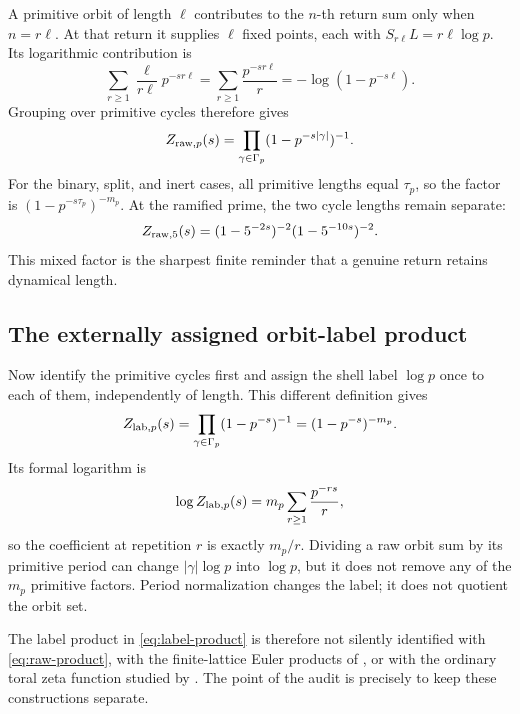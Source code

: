 \documentclass[11pt]{article}
\theoremstyle{definition}
\theoremstyle{remark}
\begin{document}
A primitive orbit of length \(\ell\) contributes to the \(n\)-th return sum
only when \(n=r\ell\).  At that return it supplies \(\ell\) fixed points,
each with \(S_{r\ell}L=r\ell\log p\).  Its logarithmic contribution is
\begin{equation}
  \sum_{r\ge1}\frac{\ell}{r\ell}p^{-sr\ell}
  =\sum_{r\ge1}\frac{p^{-sr\ell}}r
  =-\log(1-p^{-s\ell}).
  \label{eq:raw-orbit-contribution}
\end{equation}
Grouping over primitive cycles therefore gives
\begin{equation}
  Z_{\mathrm{raw},p}(s)
  =\prod_{\gamma\in\Gamma_p}
    (1-p^{-s|\gamma|})^{-1}.
  \label{eq:raw-product}
\end{equation}
For the binary, split, and inert cases, all primitive lengths equal
\(\tau_p\), so the factor is
\((1-p^{-s\tau_p})^{-m_p}\).  At the ramified prime, the two cycle lengths
remain separate:
\begin{equation}
  Z_{\mathrm{raw},5}(s)
  =(1-5^{-2s})^{-2}(1-5^{-10s})^{-2}.
  \label{eq:raw-five}
\end{equation}
This mixed factor is the sharpest finite reminder that a genuine return
retains dynamical length.

\subsection{The externally assigned orbit-label product}

Now identify the primitive cycles first and assign the shell label \(\log p\)
once to each of them, independently of length.  This different definition
gives
\begin{equation}
  Z_{\mathrm{lab},p}(s)
  =\prod_{\gamma\in\Gamma_p}(1-p^{-s})^{-1}
  =(1-p^{-s})^{-m_p}.
  \label{eq:label-product}
\end{equation}
Its formal logarithm is
\begin{equation}
  \log Z_{\mathrm{lab},p}(s)
  =m_p\sum_{r\ge1}\frac{p^{-rs}}r,
  \label{eq:label-logarithm}
\end{equation}
so the coefficient at repetition \(r\) is exactly \(m_p/r\).  Dividing a
raw orbit sum by its primitive period can change \(|\gamma|\log p\) into
\(\log p\), but it does not remove any of the \(m_p\) primitive factors.
Period normalization changes the label; it does not quotient the orbit set.

The label product in \eqref{eq:label-product} is therefore not silently
identified with \eqref{eq:raw-product}, with the finite-lattice Euler
products of \citet{BaakeRobertsWeiss2008}, or with the ordinary toral zeta
function studied by \citet{BaakeLauPaskunas2010}.  The point of the audit is
precisely to keep these constructions separate.
\end{document}
